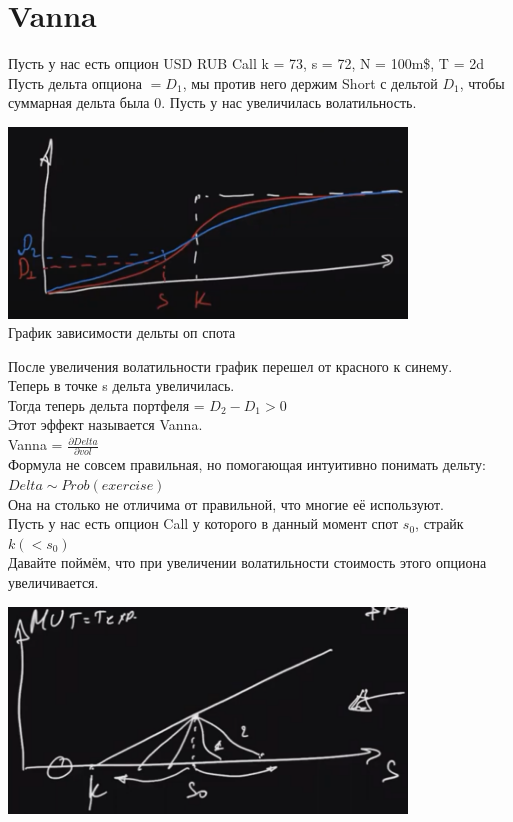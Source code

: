 \documentclass{article}
\begin{document}
\section{Vanna}
Пусть у нас есть опцион  USD RUB Call k = 73, s = 72, N = 100m\$, T = 2d\\
Пусть дельта опциона $= D_1$, мы против него держим Short с дельтой $D_1$, чтобы суммарная дельта была 0.
Пусть у нас увеличилась волатильность.\\
\begin{center}  
\includegraphics[width=300pt]{picture_11.0.png}\\
График зависимости дельты оп спота
\end{center}
После увеличения волатильности график перешел от красного к синему.\\
Теперь в точке s дельта увеличилась.\\
Тогда теперь дельта портфеля = $D_2 - D_1 > 0$\\
Этот эффект называется Vanna.\\
Vanna = $\frac{\partial Delta}{\partial vol}$\\


Формула не совсем правильная, но помогающая интуитивно понимать дельту: $Delta \sim Prob(exercise)$\\
Она на столько не отличима от правильной, что многие её используют.\\

Пусть у нас есть опцион Call у которого в данный момент спот $s_0$, страйк $k(< s_0)$\\
Давайте поймём, что при увеличении волатильности стоимость этого опциона увеличивается.\\
\begin{center}  
\includegraphics[width=300pt]{picture_11.5.png}\\
\end{center}
\end{document}
